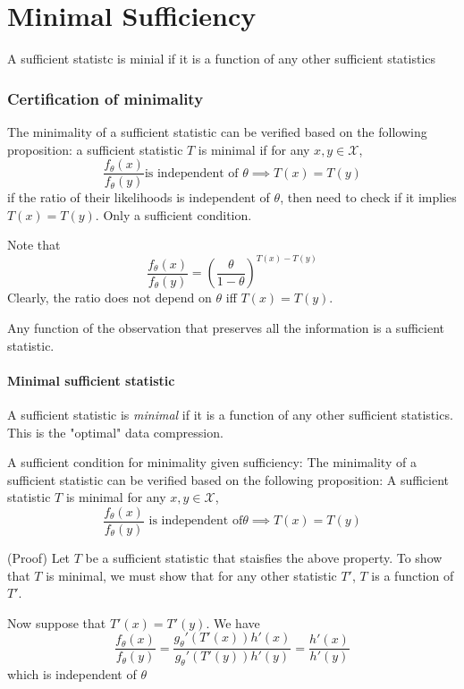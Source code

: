 \chapter{Minimal Sufficiency}

A sufficient statistc is minial if it is a function of any other sufficient statistics

\subsection{Certification of minimality}

The minimality of a sufficient statistic can be verified based on the following proposition: a sufficient statistic $T$ is minimal if for any $x, y \in \mathcal{X}$,
\[
    \frac{f_\theta(x)}{f_\theta(y)} \text{is independent of } \theta \implies T(x) = T(y)
\]
if the ratio of their likelihoods is independent of $\theta$, then need to check if it implies $T(x) = T(y)$. Only a sufficient condition.

Note that
\[
    \frac{f_\theta(x)}{f_\theta(y)} = \left( \frac{\theta}{1-\theta}\right)^{T(x)-T(y)}
\]
Clearly, the ratio does not depend on $\theta$ iff $T(x)=T(y)$.



Any function of the observation that preserves all the information is a sufficient statistic.

\subsubsection{Minimal sufficient statistic}

A sufficient statistic is \textit{minimal} if it is a function of any other sufficient statistics.
This is the "optimal" data compression.

A sufficient condition for minimality given sufficiency:
The minimality of a sufficient statistic can be verified based on the following proposition:
A sufficient statistic $T$ is minimal for any $x, y \in \mathcal{X}$,
\[
    \frac{f_\theta(x)}{f_\theta(y)} \text{ is independent of} \theta \implies T(x) = T(y)
\]

(Proof) Let $T$ be a sufficient statistic that staisfies the above property. To show that $T$
is minimal, we must show that for any other statistic $T'$, $T$ is a function of $T'$.

Now suppose that $T'(x) = T'(y)$. We have
\[
    \frac{f_\theta(x)}{f_\theta(y)} = \frac{g_\theta'(T'(x))h'(x)}{g_\theta'(T'(y))h'(y)} = \frac{h'(x)}{h'(y)}
\]
which is independent of $\theta$

